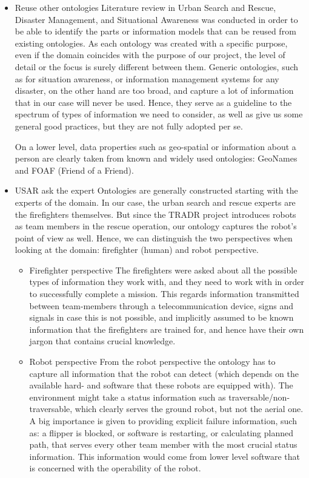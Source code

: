 \begin{itemize}
\item Reuse other ontologies
Literature review in Urban Search and Rescue, Disaster Management, and Situational Awareness was conducted in order to be able to identify the parts or information models that can be reused from existing ontologies. As each ontology was created with a specific purpose, even if the domain coincides with the purpose of our project, the level of detail or the focus is surely different between them. Generic ontologies, such as for situation awareness, or information management systems for any disaster, on the other hand are too broad, and capture a lot of information that in our case will never be used. Hence, they serve as a guideline to the spectrum of types of information we need to consider, as well as give us some general good practices, but they are not fully adopted per se. 

On a lower level, data properties such as geo-spatial or information about a person are clearly taken from known and widely used ontologies: GeoNames and FOAF (Friend of a Friend). 


\item USAR ask the expert 
Ontologies are generally constructed starting with the experts \cite{} of the domain. In our case, the urban search and rescue experts are the firefighters themselves. But since the TRADR project introduces robots as team members in the rescue operation, our ontology captures the robot's point of view as well. Hence, we can distinguish the two perspectives when looking at the domain: firefighter (human) and robot perspective.
\begin{itemize}
\item Firefighter perspective
The firefighters were asked about all the possible types of information they work with, and they need to work with in order to successfully complete a mission. This regards information transmitted between team-members through a telecommunication device, signs and signals in case this is not possible, and implicitly assumed to be known information that the firefighters are trained for, and hence have their own jargon that contains crucial knowledge.

\item Robot perspective
From the robot perspective the ontology has to capture all information that the robot can detect (which depends on the available hard- and software that these robots are equipped with). The environment might take a status information such as traversable/non-traversable, which clearly serves the ground robot, but not the aerial one. A big importance is given to providing explicit failure information, such as: a flipper is blocked, or software is restarting, or calculating planned path, that serves every other team member with the most crucial status information. This information would come from lower level software that is concerned with the operability of the robot.


\end{itemize}
\end{itemize}
